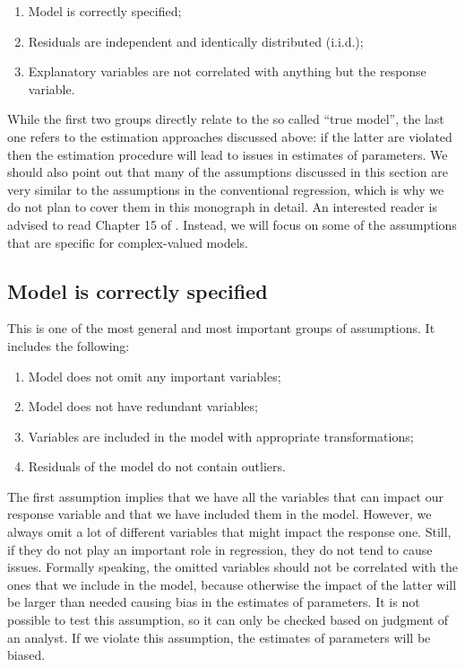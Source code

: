 \documentclass[
]{book}
\providecommand{\tightlist}{%
  \setlength{\itemsep}{0pt}\setlength{\parskip}{0pt}}
\begin{document}
\begin{enumerate}
\def\labelenumi{\arabic{enumi}.}
\tightlist
\item
  Model is correctly specified;
\item
  Residuals are independent and identically distributed (i.i.d.);
\item
  Explanatory variables are not correlated with anything but the response variable.
\end{enumerate}

While the first two groups directly relate to the so called ``true model'', the last one refers to the estimation approaches discussed above: if the latter are violated then the estimation procedure will lead to issues in estimates of parameters. We should also point out that many of the assumptions discussed in this section are very similar to the assumptions in the conventional regression, which is why we do not plan to cover them in this monograph in detail. An interested reader is advised to read Chapter 15 of \citet{SvetunkovSBA}. Instead, we will focus on some of the assumptions that are specific for complex-valued models.

\hypertarget{model-is-correctly-specified}{%
\subsection{Model is correctly specified}\label{model-is-correctly-specified}}

This is one of the most general and most important groups of assumptions. It includes the following:

\begin{enumerate}
\def\labelenumi{\arabic{enumi}.}
\tightlist
\item
  Model does not omit any important variables;
\item
  Model does not have redundant variables;
\item
  Variables are included in the model with appropriate transformations;
\item
  Residuals of the model do not contain outliers.
\end{enumerate}

The first assumption implies that we have all the variables that can impact our response variable and that we have included them in the model. However, we always omit a lot of different variables that might impact the response one. Still, if they do not play an important role in regression, they do not tend to cause issues. Formally speaking, the omitted variables should not be correlated with the ones that we include in the model, because otherwise the impact of the latter will be larger than needed causing bias in the estimates of parameters. It is not possible to test this assumption, so it can only be checked based on judgment of an analyst. If we violate this assumption, the estimates of parameters will be biased.
\end{document}
